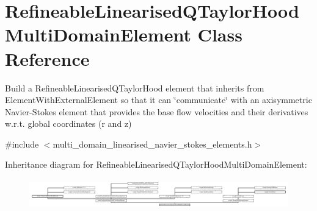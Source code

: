 \hypertarget{classRefineableLinearisedQTaylorHoodMultiDomainElement}{}\section{Refineable\+Linearised\+Q\+Taylor\+Hood\+Multi\+Domain\+Element Class Reference}
\label{classRefineableLinearisedQTaylorHoodMultiDomainElement}


Build a Refineable\+Linearised\+Q\+Taylor\+Hood element that inherits from Element\+With\+External\+Element so that it can \char`\"{}communicate\char`\"{} with an axisymmetric Navier-\/\+Stokes element that provides the base flow velocities and their derivatives w.\+r.\+t. global coordinates (r and z)  




{\ttfamily \#include $<$multi\+\_\+domain\+\_\+linearised\+\_\+navier\+\_\+stokes\+\_\+elements.\+h$>$}

Inheritance diagram for Refineable\+Linearised\+Q\+Taylor\+Hood\+Multi\+Domain\+Element\+:\begin{figure}[H]
\begin{center}
\leavevmode
\includegraphics[height=1.280488cm]{classRefineableLinearisedQTaylorHoodMultiDomainElement}
\end{center}
\end{figure}
